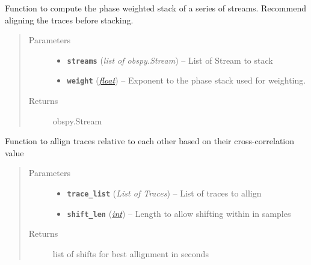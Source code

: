 \documentclass[a4paper,10pt,english]{sphinxmanual}
\begin{document}
\begin{fulllineitems}
\label{utils:stacking.PWS_stack}
Function to compute the phase weighted stack of a series of streams.
Recommend aligning the traces before stacking.
\begin{quote}\begin{description}
\item[{Parameters}] \leavevmode\begin{itemize}
\item {} 
\textbf{\texttt{streams}} (\emph{list of obspy.Stream}) -- List of Stream to stack

\item {} 
\textbf{\texttt{weight}} (\href{https://docs.python.org/library/functions.html\#float}{\emph{float}}) -- Exponent to the phase stack used for weighting.

\end{itemize}

\item[{Returns}] \leavevmode
obspy.Stream

\end{description}\end{quote}

\end{fulllineitems}


\begin{fulllineitems}
\label{utils:stacking.align_traces}
Function to allign traces relative to each other based on their
cross-correlation value
\begin{quote}\begin{description}
\item[{Parameters}] \leavevmode\begin{itemize}
\item {} 
\textbf{\texttt{trace\_list}} (\emph{List of Traces}) -- List of traces to allign

\item {} 
\textbf{\texttt{shift\_len}} (\href{https://docs.python.org/library/functions.html\#int}{\emph{int}}) -- Length to allow shifting within in samples

\end{itemize}

\item[{Returns}] \leavevmode
list of shifts for best allignment in seconds

\end{description}\end{quote}

\end{fulllineitems}
\end{document}
